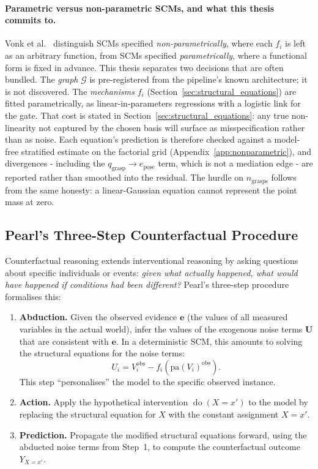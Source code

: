 \documentclass[11pt,a4paper]{report}
\newcommand{\doop}{\operatorname{do}}
\begin{document}
\paragraph{Parametric versus non-parametric SCMs, and what this thesis commits to.} Vonk et al.~\cite{vonk2023disentangling} distinguish SCMs specified \emph{non-parametrically}, where each $f_i$ is left as an arbitrary function, from SCMs specified \emph{parametrically}, where a functional form is fixed in advance. This thesis separates two decisions that are often bundled. The \emph{graph} $\mathcal{G}$ is pre-registered from the pipeline's known architecture; it is not discovered. The \emph{mechanisms} $f_i$ (Section~\ref{sec:structural_equations}) are fitted parametrically, as linear-in-parameters regressions with a logistic link for the gate. That cost is stated in Section~\ref{sec:structural_equations}: any true non-linearity not captured by the chosen basis will surface as misspecification rather than as noise. Each equation's prediction is therefore checked against a model-free stratified estimate on the factorial grid (Appendix~\ref{app:nonparametric}), and divergences - including the $q_{\text{grasp}} \to e_{\text{pose}}$ term, which is not a mediation edge - are reported rather than smoothed into the residual. The hurdle on $n_{\text{grasps}}$ follows from the same honesty: a linear-Gaussian equation cannot represent the point mass at zero.

\subsection{Pearl's Three-Step Counterfactual Procedure}

Counterfactual reasoning extends interventional reasoning by asking questions about specific individuals or events: \emph{given what actually happened, what would have happened if conditions had been different?} Pearl's three-step procedure~\cite{pearl2018book} formalises this:

\begin{enumerate}
  \item \textbf{Abduction.} Given the observed evidence $\mathbf{e}$ (the values of all measured variables in the actual world), infer the values of the exogenous noise terms $\mathbf{U}$ that are consistent with $\mathbf{e}$. In a deterministic SCM, this amounts to solving the structural equations for the noise terms:
  \begin{equation}
    U_i = V_i^{\text{obs}} - f_i(\text{pa}(V_i)^{\text{obs}}).
    \label{eq:abduction}
  \end{equation}
  This step ``personalises'' the model to the specific observed instance.

  \item \textbf{Action.} Apply the hypothetical intervention $\doop(X = x')$ to the model by replacing the structural equation for $X$ with the constant assignment $X = x'$.

  \item \textbf{Prediction.} Propagate the modified structural equations forward, using the abducted noise terms from Step~1, to compute the counterfactual outcome $Y_{X=x'}$.
\end{enumerate}
\end{document}
